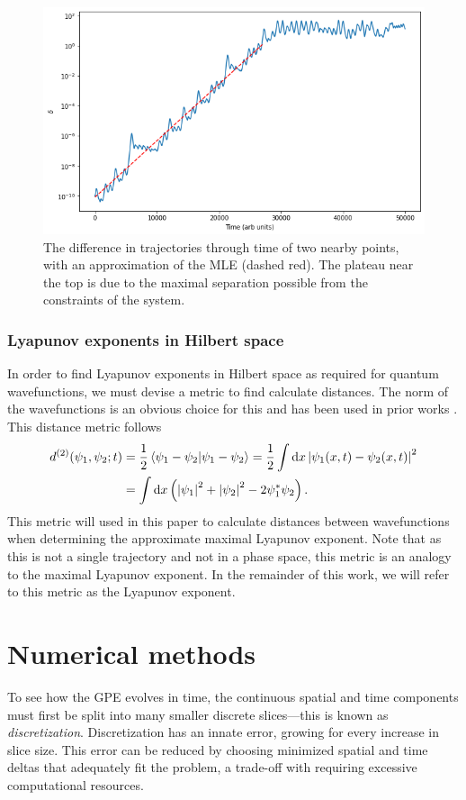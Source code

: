 \begin{figure}[p]
	\centering
	\includegraphics[width=0.7\linewidth]{chapter2/lorenzexp}
	\caption[Lyapunov exponent graphical approximation of the Lorenz system.]{The difference in trajectories through time of two nearby points, with an approximation of the MLE (dashed red). The plateau near the top is due to the maximal separation possible from the constraints of the system. }
	\label{fig:lorenzexp}
\end{figure}

\subsubsection{Lyapunov exponents in Hilbert space}
In order to find Lyapunov exponents in Hilbert space as required for quantum wavefunctions, we must devise a metric to find calculate distances. The norm of the wavefunctions is an obvious choice for this and has been used in prior works \cite{PhysRevA.83.043611}. This distance metric follows \begin{align}
	d^{(2)}(\psi_1, \psi_2; t) & = \frac{1}{2} \braket{\psi_1 - \psi_2}{\psi_1 - \psi_2} = \frac{1}{2} \int \dd{x} \abs{\psi_1(x, t) - \psi_2(x, t)}^2 \notag \\
		& = \int \dd{x} \left( \abs{\psi_1}^2 + \abs{\psi_2}^2 - 2 \psi_1^* \psi_2 \right). \label{eq:dist}
\end{align}
This metric will used in this paper to calculate distances between wavefunctions when determining the approximate maximal Lyapunov exponent. Note that as this is not a single trajectory and not in a phase space, this metric is an analogy to the maximal Lyapunov exponent. In the remainder of this work, we will refer to this metric as the Lyapunov exponent.


\section{Numerical methods}
To see how the GPE evolves in time, the continuous spatial and time components must first be split into many smaller discrete slices---this is known as \textit{discretization}. Discretization has an innate error, growing for every increase in slice size. This error can be reduced by choosing minimized spatial and time deltas that adequately fit the problem, a trade-off with requiring excessive computational resources.

